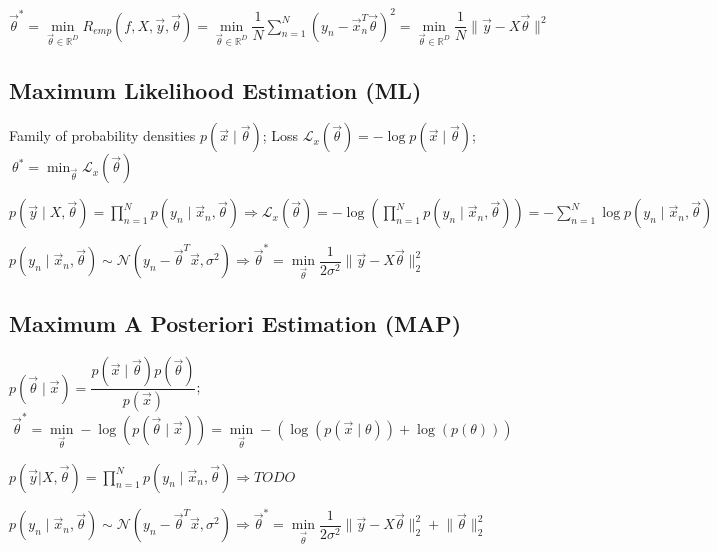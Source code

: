 \documentclass[]{article}
\begin{document}
	$\vec{\theta}^* = \min\limits_{\vec{\theta} \in \mathbb{R}^D} R_{emp}(f,X,\vec{y},\vec{\theta}) = \min\limits_{\vec{\theta} \in \mathbb{R}^D} \dfrac{1}{N} \sum\limits_{n=1}^N (y_n - \vec{x}_n^T\vec{\theta})^2 = \min\limits_{\vec{\theta} \in \mathbb{R}^D} \dfrac{1}{N} \lVert \vec{y} - X \vec{\theta} \rVert^2$
	
	\subsection{Maximum Likelihood Estimation (ML)}
	
	Family of probability densities $p(\vec{x}\mid\vec{\theta})$;
	Loss $ \mathcal{L}_x(\vec{\theta}) = - \log p(\vec{x}\mid\vec{\theta})$;
	$\ \theta^* = \min_{\vec{\theta}} \mathcal{L}_x (\vec{\theta})$
	
	$p(\vec{y}\mid X,\vec{\theta})=\prod\limits_{n=1}^N p(y_n\mid\vec{x}_n,\vec{\theta}) \Rightarrow \mathcal{L}_x(\vec{\theta}) = - \log \left(\prod\limits_{n=1}^N p(y_n\mid\vec{x}_n,\vec{\theta})\right) = -\sum\limits_{n=1}^N \log p(y_n\mid\vec{x}_n,\vec{\theta})$
	
	$p(y_n\mid\vec{x}_n,\vec{\theta}) \sim \mathcal{N}(y_n - \vec{\theta}^T\vec{x}, \sigma^2) \Rightarrow \vec{\theta}^* = \min\limits_{\vec{\theta}} \dfrac{1}{2\sigma^2} \lVert\vec{y}-X\vec{\theta}\rVert_2^2$
	
	\subsection{Maximum A Posteriori Estimation (MAP)}
	
	$p(\vec{\theta}\mid\vec{x}) = \dfrac{p(\vec{x}\mid\vec{\theta}) p(\vec{\theta})}{p(\vec{x})}$;	
	$\ \vec{\theta}^* = \min\limits_{\vec{\theta}} -\log(p(\vec{\theta}\mid\vec{x})) =  \min\limits_{\vec{\theta}} - (\log (p(\vec{x}\mid\theta)) + \log(p(\theta)))$
	
	$p(\vec{y}|X,\vec{\theta}) = \prod\limits_{n=1}^N p(y_n\mid\vec{x}_n,\vec{\theta}) \Rightarrow TODO$
	
	$p(y_n\mid\vec{x}_n,\vec{\theta}) \sim \mathcal{N}(y_n - \vec{\theta}^T\vec{x}, \sigma^2) \Rightarrow \vec{\theta}^* = \min\limits_{\vec{\theta}} \dfrac{1}{2\sigma^2} \lVert\vec{y}-X\vec{\theta}\rVert_2^2 
	 + \lVert\vec{\theta}\rVert_2^2$
	
\end{document}
